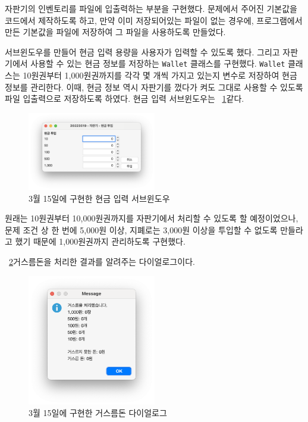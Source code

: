 \documentclass{oblivoir}
\newcommand{\figref}[1]{\figurename~\ref{#1}}
\begin{document}
    자판기의 인벤토리를 파일에 입출력하는 부분을 구현했다.
    문제에서 주어진 기본값을 코드에서 제작하도록 하고,
    만약 이미 저장되어있는 파일이 없는 경우에, 프로그램에서 만든 기본값을 파일에 저장하여
    그 파일을 사용하도록 만들었다.

    서브윈도우를 만들어 현금 입력 용량을 사용자가 입력할 수 있도록 했다.
    그리고 자판기에서 사용할 수 있는 현금 정보를 저장하는 \texttt{Wallet} 클래스를 구현했다.
    \texttt{Wallet} 클래스는 10원권부터 1,000원권까지를 각각 몇 개씩 가지고 있는지 변수로 저장하여 현금 정보를 관리한다.
    이때, 현금 정보 역시 자판기를 껐다가 켜도 그대로 사용할 수 있도록 파일 입출력으로 저장하도록 하였다.
    현금 입력 서브윈도우는 \figref{fig:0315-cash-input-prompt}\과 같다.
    \begin{figure}[h]
        \centering
        \includegraphics[width=0.5\textwidth]{images/dev-snapshop/0315-cash-input-prompt}
        \caption{3월 15일에 구현한 현금 입력 서브윈도우}
        \label{fig:0315-cash-input-prompt}
    \end{figure}

    원래는 10원권부터 10,000원권까지를 자판기에서 처리할 수 있도록 할 예정이었으나,
    문제 조건 상 한 번에 5,000원 이상, 지폐로는 3,000원 이상을 투입할 수 없도록 만들라고 했기 때문에
    1,000원권까지 관리하도록 구현했다.

    \figref{fig:0315-change-dialog}\은 거스름돈을 처리한 결과를 알려주는 다이얼로그이다.
    \begin{figure}[h]
        \centering
        \includegraphics[width=0.5\textwidth]{images/dev-snapshop/0315-change-dialog}
        \caption{3월 15일에 구현한 거스름돈 다이얼로그}
        \label{fig:0315-change-dialog}
    \end{figure}
\end{document}
